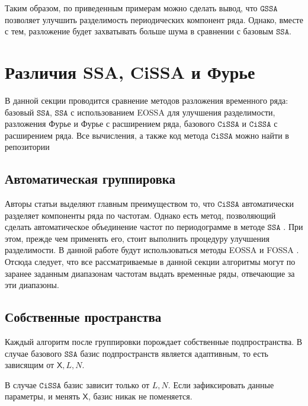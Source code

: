 \documentclass[12pt, specialist, subf
]{disser}
\theoremstyle{definition}
\newcommand{\SSA}{\texttt{SSA}}
\newcommand{\GSSA}{\texttt{GSSA}}
\newcommand{\CISSA}{\texttt{CiSSA}}
\newcommand{\TS}{\mathsf{X}}
\begin{document}
Таким образом, по приведенным примерам можно сделать вывод, что $\GSSA$ позволяет улучшить разделимость периодических компонент ряда. Однако, вместе с тем, разложение будет захватывать больше шума в сравнении с базовым $\SSA$.




\newpage





\section{Различия SSA, CiSSA и Фурье}

\label{sec:comparison_cissa}
В данной секции проводится сравнение методов разложения временного ряда: базовый $\SSA$,  $\SSA$ с использованием EOSSA для улучшения разделимости, разложения Фурье и Фурье с расширением ряда, базового $\CISSA$ и $\CISSA$ с расширением ряда. Все вычисления, а также код метода $\CISSA$ можно найти в репозитории \cite{spbu_cissa_coursework_github}


\subsection{Автоматическая группировка}

\label{subsubsec:autogroup}

Авторы статьи \cite{bogalo2020} выделяют главным преимуществом то, что $\CISSA$ автоматически разделяет компоненты ряда по частотам. Однако есть метод, позволяющий сделать автоматическое объединение частот по периодограмме в методе $\SSA$
\cite{golyandina2023automatedidentificationsingularspectrum}
. При этом, прежде чем применять его, стоит выполнить процедуру улучшения разделимости. В данной работе будут использоваться методы EOSSA и FOSSA \cite{golyandina2023intelligent}. Отсюда следует, что все рассматриваемые в данной секции алгоритмы могут по заранее заданным диапазонам частотам выдать временные ряды, отвечающие за эти диапазоны.



\subsection{Собственные пространства}
Каждый алгоритм после группировки порождает собственные подпространства. В случае базового $\SSA$ базис подпространств является адаптивным, то есть зависящим от $\TS, L, N$.

В случае $\CISSA$ базис зависит только от $L, N$. Если зафиксировать данные параметры, и менять $\TS$, базис никак не поменяется.
\end{document}
